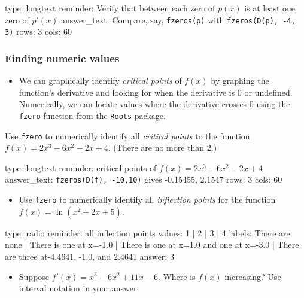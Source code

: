 \documentclass[12pt]{article}
\begin{document}
\begin{answer}
type: longtext
reminder: Verify that between each zero of \( p(x) \) is at least one zero of \( p'(x) \)
answer_text: Compare, say, \verb+fzeros(p)+ with \verb+fzeros(D(p), -4, 3)+ 
rows: 3
cols: 60
\end{answer}

\subsubsection{Finding numeric values}

\begin{itemize}
\itemsep1pt\parskip0pt
\item
  We can graphically identify \emph{critical points} of $f(x)$ by
  graphing the function's derivative and looking for when the derivative
  is 0 or undefined. Numerically, we can locate values where the
  derivative crosses $0$ using the \texttt{fzero} function from the
  \texttt{Roots} package.
\end{itemize}

Use \texttt{fzero} to numerically identify all \emph{critical points} to
the function $f(x) = 2x^3 - 6x^2 - 2x + 4$. (There are no more than
$2$.)

\begin{answer}
type: longtext
reminder: critical points of \( f(x) = 2x^3 - 6x^2 - 2x + 4 \)
answer_text: \verb+fzeros(D(f), -10,10)+ gives -0.15455, 2.1547 
rows: 3
cols: 60
\end{answer}

\begin{itemize}
\itemsep1pt\parskip0pt
\item
  Use \texttt{fzero} to numerically identify all \emph{inflection
  points} for the function $f(x) = \ln(x^2 + 2x + 5)$.
\end{itemize}

\begin{answer}
type: radio
reminder: all inflection points
values: 1 | 2 | 3 | 4
labels: There are none | There is one at x=-1.0 | There is one at x=1.0 and one at x=-3.0 | There are three at-4.4641, -1.0, and 2.4641
answer: 3
\end{answer}

\begin{itemize}
\itemsep1pt\parskip0pt
\item
  Suppose $f'(x) = x^3 - 6x^2 + 11x - 6$. Where is $f(x)$ increasing?
  Use interval notation in your answer.
\end{itemize}
\end{document}
